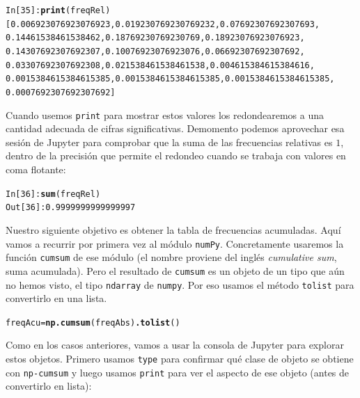 \documentclass[10pt,a4paper]{article}\usepackage[]{graphicx}\usepackage[]{color}
\makeatletter
\newcommand{\hlnum}[1]{\textcolor[rgb]{0.686,0.059,0.569}{#1}}%
\newcommand{\hlopt}[1]{\textcolor[rgb]{0,0,0}{#1}}%
\newcommand{\hlstd}[1]{\textcolor[rgb]{0.345,0.345,0.345}{#1}}%
\newcommand{\hlkwd}[1]{\textcolor[rgb]{0.737,0.353,0.396}{\textbf{#1}}}%
\newenvironment{kframe}{%
 \def\at@end@of@kframe{}%
 \ifinner\ifhmode%
  \def\at@end@of@kframe{\end{minipage}}%
  \begin{minipage}{\columnwidth}%
 \fi\fi%
 \def\FrameCommand##1{\hskip\@totalleftmargin \hskip-\fboxsep
 \colorbox{shadecolor}{##1}\hskip-\fboxsep
     \hskip-\linewidth \hskip-\@totalleftmargin \hskip\columnwidth}%
 \MakeFramed {\advance\hsize-\width
   \@totalleftmargin\z@ \linewidth\hsize
   \@setminipage}}%
 {\par\unskip\endMakeFramed%
 \at@end@of@kframe}
\newenvironment{knitrout}{}{} %
\makeatother
\begin{document}
\begin{knitrout}
\color{fgcolor}\begin{kframe}
\begin{alltt}
In [35]: \hlkwd{print}(freqRel)
[0.006923076923076923, 0.019230769230769232, 0.07692307692307693,
0.14461538461538462, 0.18769230769230769, 0.18923076923076923,
0.14307692307692307, 0.10076923076923076, 0.06692307692307692,
0.03307692307692308, 0.021538461538461538, 0.004615384615384616,
0.0015384615384615385, 0.0015384615384615385, 0.0015384615384615385,
0.0007692307692307692]
\end{alltt}
\end{kframe}
\end{knitrout}
Cuando usemos {\tt print} para mostrar estos valores los redondearemos a una cantidad adecuada de cifras significativas. Demomento podemos aprovechar esa sesión de Jupyter para comprobar que la suma de las frecuencias relativas es $1$, dentro de la precisión que permite el redondeo cuando se trabaja con valores en coma flotante:
\begin{knitrout}
\color{fgcolor}\begin{kframe}
\begin{alltt}
\hlstd{In [}\hlnum{36}\hlstd{]}\hlopt{:} \hlkwd{sum}\hlstd{(freqRel)}
\hlstd{Out[}\hlnum{36}\hlstd{]}\hlopt{:} \hlnum{0.9999999999999997}
\end{alltt}
\end{kframe}
\end{knitrout}
Nuestro siguiente objetivo es obtener la tabla de frecuencias acumuladas. Aquí vamos a recurrir por primera vez al módulo {\tt numPy}. Concretamente usaremos la función {\tt cumsum} de ese módulo (el nombre proviene del inglés {\em cumulative sum}, suma acumulada). Pero el resultado de {\tt cumsum} es un objeto de un tipo que aún no hemos visto, el tipo {\tt ndarray} de {\tt numpy}. Por eso usamos el método {\tt tolist} para convertirlo en una lista.
\begin{knitrout}
\color{fgcolor}\begin{kframe}
\begin{alltt}
freqAcu = \hlkwd{np.cumsum}(freqAbs)\hlkwd{.tolist}()
\end{alltt}
\end{kframe}
\end{knitrout}
Como en los casos anteriores, vamos a usar la consola de Jupyter para explorar estos objetos. Primero usamos {\tt type} para confirmar qué clase de objeto se obtiene con {\tt np-cumsum} y luego usamos {\tt print} para ver el aspecto de ese objeto (antes de convertirlo en lista):
\end{document}
